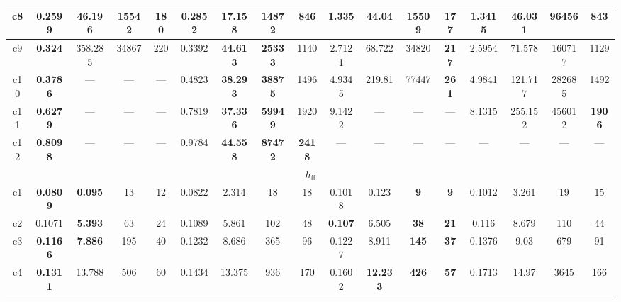 \begin{tabular}{||c||c|c|c|c||c|c|c|c||c|c|c|c||c|c|c|c||}
\hline%
c8&\small{\textbf{0.2599}}&\small{46.196}&\small{15542}&\small{180}&\small{0.2852}&\small{\textbf{17.158}}&\small{\textbf{14872}}&\small{846}&\small{1.335}&\small{44.04}&\small{15509}&\small{\textbf{177}}&\small{1.3415}&\small{46.031}&\small{96456}&\small{843}\\%
\hline%
c9&\small{\textbf{0.324}}&\small{358.285}&\small{34867}&\small{220}&\small{0.3392}&\small{\textbf{44.613}}&\small{\textbf{25333}}&\small{1140}&\small{2.7121}&\small{68.722}&\small{34820}&\small{\textbf{217}}&\small{2.5954}&\small{71.578}&\small{160717}&\small{1129}\\%
\hline%
c10&\small{\textbf{0.3786}}&\small{---}&\small{---}&\small{---}&\small{0.4823}&\small{\textbf{38.293}}&\small{\textbf{38875}}&\small{1496}&\small{4.9345}&\small{219.81}&\small{77447}&\small{\textbf{261}}&\small{4.9841}&\small{121.717}&\small{282685}&\small{1492}\\%
\hline%
c11&\small{\textbf{0.6279}}&\small{---}&\small{---}&\small{---}&\small{0.7819}&\small{\textbf{37.336}}&\small{\textbf{59949}}&\small{1920}&\small{9.1422}&\small{---}&\small{---}&\small{---}&\small{8.1315}&\small{255.152}&\small{456012}&\small{\textbf{1906}}\\%
\hline%
c12&\small{\textbf{0.8098}}&\small{---}&\small{---}&\small{---}&\small{0.9784}&\small{\textbf{44.558}}&\small{\textbf{87472}}&\small{\textbf{2418}}&\small{---}&\small{---}&\small{---}&\small{---}&\small{---}&\small{---}&\small{---}&\small{---}\\%
\hline%
\multicolumn{17}{||c||}{$h_{\mathsf{ff}}$}\\%
\hline%
c1&\small{\textbf{0.0809}}&\small{\textbf{0.095}}&\small{13}&\small{12}&\small{0.0822}&\small{2.314}&\small{18}&\small{18}&\small{0.1018}&\small{0.123}&\small{\textbf{9}}&\small{\textbf{9}}&\small{0.1012}&\small{3.261}&\small{19}&\small{15}\\%
\hline%
c2&\small{0.1071}&\small{\textbf{5.393}}&\small{63}&\small{24}&\small{0.1089}&\small{5.861}&\small{102}&\small{48}&\small{\textbf{0.107}}&\small{6.505}&\small{\textbf{38}}&\small{\textbf{21}}&\small{0.116}&\small{8.679}&\small{110}&\small{44}\\%
\hline%
c3&\small{\textbf{0.1166}}&\small{\textbf{7.886}}&\small{195}&\small{40}&\small{0.1232}&\small{8.686}&\small{365}&\small{96}&\small{0.1227}&\small{8.911}&\small{\textbf{145}}&\small{\textbf{37}}&\small{0.1376}&\small{9.03}&\small{679}&\small{91}\\%
\hline%
c4&\small{\textbf{0.1311}}&\small{13.788}&\small{506}&\small{60}&\small{0.1434}&\small{13.375}&\small{936}&\small{170}&\small{0.1602}&\small{\textbf{12.233}}&\small{\textbf{426}}&\small{\textbf{57}}&\small{0.1713}&\small{14.97}&\small{3645}&\small{166}\\%

\end{tabular}
